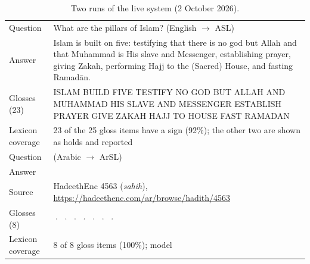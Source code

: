 \begin{table}[ht]
\centering\small
\caption{Two runs of the live system (2 October 2026).}
\label{tab:runs}
\begin{tabularx}{\textwidth}{L{2.6cm} Y}
\toprule
Question & What are the pillars of Islam? (English $\rightarrow$ ASL) \\
Answer & Islam is built on five: testifying that there is no god but Allah and that Muhammad is His slave and
Messenger, establishing prayer, giving Zakah, performing Hajj to the (Sacred) House, and fasting Ramad\=an. \\
Glosses (23) & ISLAM BUILD FIVE TESTIFY NO GOD BUT ALLAH AND MUHAMMAD HIS SLAVE AND MESSENGER ESTABLISH PRAYER GIVE ZAKAH
HAJJ TO HOUSE FAST RAMADAN \\
Lexicon coverage & 23 of the 25 gloss items have a sign (92\%); the other two are shown as holds and reported \\
\midrule
Question &  (Arabic $\rightarrow$ ArSL) \\
Answer &  \\
Source & HadeethEnc 4563 (\emph{sahih}), \url{https://hadeethenc.com/ar/browse/hadith/4563} \\
Glosses (8) &  \;·\;  \;·\;  \;·\;  \;·\;  \;·\; 
\;·\;  \;·\;  \\
Lexicon coverage & 8 of 8 gloss items (100\%); model  \\
\bottomrule
\end{tabularx}
\end{table}
